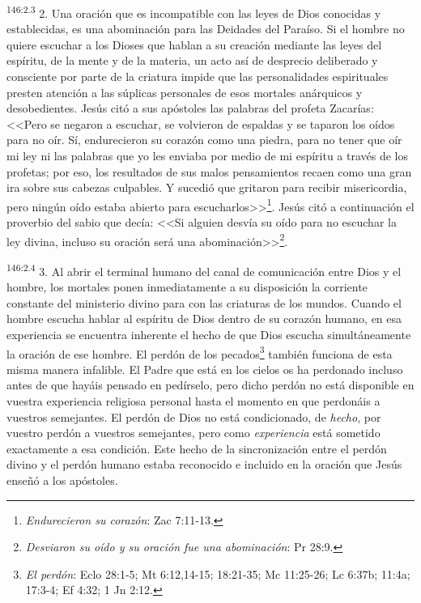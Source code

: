 \par 
\textsuperscript{146:2.3} 2. Una oración que es incompatible con las leyes de Dios conocidas y establecidas, es una abominación para las Deidades del Paraíso. Si el hombre no quiere escuchar a los Dioses que hablan a su creación mediante las leyes del espíritu, de la mente y de la materia, un acto así de desprecio deliberado y consciente por parte de la criatura impide que las personalidades espirituales presten atención a las súplicas personales de esos mortales anárquicos y desobedientes. Jesús citó a sus apóstoles las palabras del profeta Zacarías: <<Pero se negaron a escuchar, se volvieron de espaldas y se taparon los oídos para no oír. Sí, endurecieron su corazón como una piedra, para no tener que oír mi ley ni las palabras que yo les enviaba por medio de mi espíritu a través de los profetas; por eso, los resultados de sus malos pensamientos recaen como una gran ira sobre sus cabezas culpables. Y sucedió que gritaron para recibir misericordia, pero ningún oído estaba abierto para escucharlos>>\footnote{\textit{Endurecieron su corazón}: Zac 7:11-13.}. Jesús citó a continuación el proverbio del sabio que decía: <<Si alguien desvía su oído para no escuchar la ley divina, incluso su oración será una abominación>>\footnote{\textit{Desviaron su oído y su oración fue una abominación}: Pr 28:9.}.

\par 
\textsuperscript{146:2.4} 3. Al abrir el terminal humano del canal de comunicación entre Dios y el hombre, los mortales ponen inmediatamente a su disposición la corriente constante del ministerio divino para con las criaturas de los mundos. Cuando el hombre escucha hablar al espíritu de Dios dentro de su corazón humano, en esa experiencia se encuentra inherente el hecho de que Dios escucha simultáneamente la oración de ese hombre. El perdón de los pecados\footnote{\textit{El perdón}: Eclo 28:1-5; Mt 6:12,14-15; 18:21-35; Mc 11:25-26; Lc 6:37b; 11:4a; 17:3-4; Ef 4:32; 1 Jn 2:12.} también funciona de esta misma manera infalible. El Padre que está en los cielos os ha perdonado incluso antes de que hayáis pensado en pedírselo, pero dicho perdón no está disponible en vuestra experiencia religiosa personal hasta el momento en que perdonáis a vuestros semejantes. El perdón de Dios no está condicionado, de \textit{hecho}, por vuestro perdón a vuestros semejantes, pero como \textit{experiencia} está sometido exactamente a esa condición. Este hecho de la sincronización entre el perdón divino y el perdón humano estaba reconocido e incluido en la oración que Jesús enseñó a los apóstoles.

